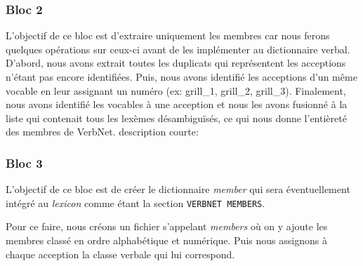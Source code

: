 \subsubsection{Bloc 2}
L'objectif de ce bloc est d'extraire uniquement les membres car nous ferons quelques opérations sur ceux-ci avant de les implémenter au dictionnaire verbal. D'abord, nous avons extrait toutes les duplicats qui représentent les acceptions n'étant pas encore identifiées. Puis, nous avons identifié les acceptions d'un même vocable en leur assignant un numéro (ex: grill\_1, grill\_2, grill\_3). Finalement, nous avons identifié les vocables à une acception et nous les avons fusionné à la liste qui contenait tous les lexèmes désambiguïsés, ce qui nous donne l'entièreté des membres de VerbNet.
description courte:

\subsubsection{Bloc 3}
L'objectif de ce bloc est de créer le dictionnaire \emph{member} qui sera éventuellement intégré au \emph{lexicon} comme étant la section \texttt{VERBNET MEMBERS}.

Pour ce faire, nous créons un fichier s'appelant \emph{members} où on y ajoute les membres classé en ordre alphabétique et numérique. Puis nous assignons à chaque acception la classe verbale qui lui correspond.

